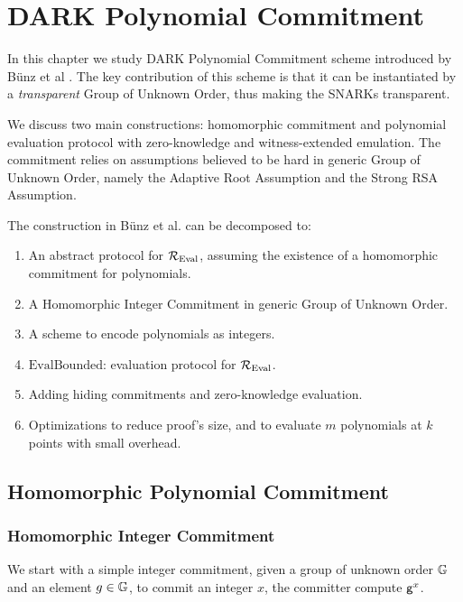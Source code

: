 \chapter{DARK Polynomial Commitment}
\label{chap-dark}

In this chapter we study DARK Polynomial Commitment scheme introduced by B\"unz et al \cite{bunz2020transparent}. The key contribution of this scheme is that it can be instantiated by a \textit{transparent} Group of Unknown Order, thus making the SNARKs transparent.

We discuss two main constructions: homomorphic commitment and polynomial evaluation protocol with zero-knowledge and witness-extended emulation. The commitment relies on assumptions believed to be hard in generic Group of Unknown Order, namely the Adaptive Root Assumption and the Strong RSA Assumption.

The construction in B\"unz et al. \cite{bunz2020transparent} can be decomposed to:
\begin{enumerate}
    \item An abstract protocol for $\mathcal{R}_{\mathrm{Eval}}$, assuming the existence of a homomorphic commitment for polynomials.
    \item A Homomorphic Integer Commitment in generic Group of Unknown Order.
    \item A scheme to encode polynomials as integers.
    \item $\mathrm{EvalBounded}$: evaluation protocol for $\mathcal{R}_{\mathrm{Eval}}$.
    \item Adding hiding commitments and zero-knowledge evaluation.
    \item Optimizations to reduce proof's size, and to evaluate $m$ polynomials at $k$ points with small overhead.
\end{enumerate}

\section{Homomorphic Polynomial Commitment}

\subsection{Homomorphic Integer Commitment}
\label{section-integer-commitment}

We start with a simple integer commitment, given a group of unknown order $\mathbb{G}$ and an element $g \in \mathbb{G}$, to commit an integer $x$, the committer compute $\mathsf{g}^x$.

